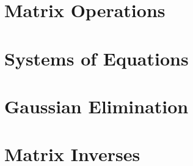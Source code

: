 \documentclass{ximera}
\begin{document}
\section*{Matrix Operations}


\section*{Systems of Equations}

\section*{Gaussian Elimination}


\section*{Matrix Inverses}
\end{document}
